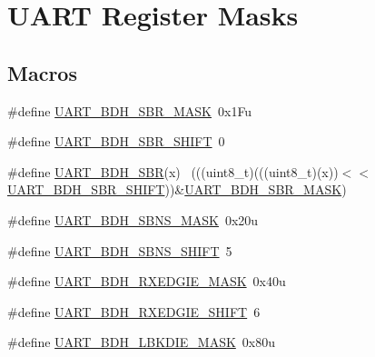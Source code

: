 \hypertarget{group___u_a_r_t___register___masks}{}\section{U\+A\+RT Register Masks}
\label{group___u_a_r_t___register___masks}
\subsection*{Macros}
\begin{DoxyCompactItemize}
\item 
\#define \hyperlink{group___u_a_r_t___register___masks_ga2680dc8176b0c933b4a1b77c5dbb64b7}{U\+A\+R\+T\+\_\+\+B\+D\+H\+\_\+\+S\+B\+R\+\_\+\+M\+A\+SK}~0x1\+Fu
\item 
\#define \hyperlink{group___u_a_r_t___register___masks_gac38d8a98be282d97c4837597a6c02cda}{U\+A\+R\+T\+\_\+\+B\+D\+H\+\_\+\+S\+B\+R\+\_\+\+S\+H\+I\+FT}~0
\item 
\#define \hyperlink{group___u_a_r_t___register___masks_ga28b137858fb0891d9d7e15f3664803c4}{U\+A\+R\+T\+\_\+\+B\+D\+H\+\_\+\+S\+BR}(x)                                                ~(((uint8\+\_\+t)(((uint8\+\_\+t)(x))$<$$<$\hyperlink{group___u_a_r_t___register___masks_gac38d8a98be282d97c4837597a6c02cda}{U\+A\+R\+T\+\_\+\+B\+D\+H\+\_\+\+S\+B\+R\+\_\+\+S\+H\+I\+FT}))\&\hyperlink{group___u_a_r_t___register___masks_ga2680dc8176b0c933b4a1b77c5dbb64b7}{U\+A\+R\+T\+\_\+\+B\+D\+H\+\_\+\+S\+B\+R\+\_\+\+M\+A\+SK})
\item 
\#define \hyperlink{group___u_a_r_t___register___masks_ga727c0ef3199f627c85fc740265d5134d}{U\+A\+R\+T\+\_\+\+B\+D\+H\+\_\+\+S\+B\+N\+S\+\_\+\+M\+A\+SK}~0x20u
\item 
\#define \hyperlink{group___u_a_r_t___register___masks_ga4d6023b67150b98ef12dba445f773109}{U\+A\+R\+T\+\_\+\+B\+D\+H\+\_\+\+S\+B\+N\+S\+\_\+\+S\+H\+I\+FT}~5
\item 
\#define \hyperlink{group___u_a_r_t___register___masks_ga0882debd8f2c52d4ab8461b22b6519d9}{U\+A\+R\+T\+\_\+\+B\+D\+H\+\_\+\+R\+X\+E\+D\+G\+I\+E\+\_\+\+M\+A\+SK}~0x40u
\item 
\#define \hyperlink{group___u_a_r_t___register___masks_ga97c5d15ae3144492e364744236aa10f7}{U\+A\+R\+T\+\_\+\+B\+D\+H\+\_\+\+R\+X\+E\+D\+G\+I\+E\+\_\+\+S\+H\+I\+FT}~6
\item 
\#define \hyperlink{group___u_a_r_t___register___masks_ga88fb29d1cb045a09e851a31c689ef60e}{U\+A\+R\+T\+\_\+\+B\+D\+H\+\_\+\+L\+B\+K\+D\+I\+E\+\_\+\+M\+A\+SK}~0x80u
$$
\end{DoxyCompactItemize}

